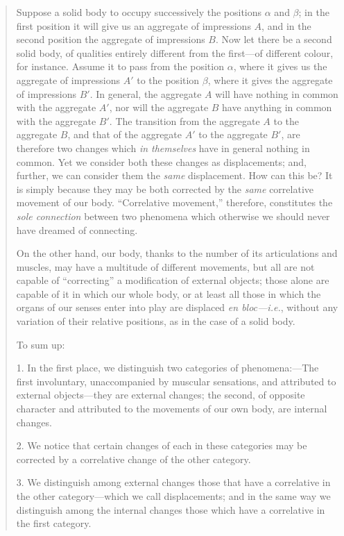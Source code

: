 \documentclass{article}
\begin{document}
\begin{quote}
    Suppose a solid body to occupy successively the positions $\alpha$ and $\beta$; in the first position it will give us an aggregate of impressions $A$, and in the second position the aggregate of impressions $B$.  Now let there be a second solid body, of qualities entirely different from the first---of different colour, for instance.  Assume it to pass from the position $\alpha$, where it gives us the aggregate of impressions $A'$ to the position $\beta$, where it gives the aggregate of impressions $B'$.  In general, the aggregate $A$ will have nothing in common with the aggregate $A'$, nor will the aggregate $B$ have anything in common with the aggregate $B'$.  The transition from the aggregate $A$ to the aggregate $B$, and that of the aggregate $A'$ to the aggregate $B'$, are therefore two changes which \emph{in themselves} have in general nothing in common.  Yet we consider both these changes as displacements; and, further, we can consider them the \emph{same} displacement.  How can this be?  It is simply because they may be both corrected by the \emph{same} correlative movement of our body.  ``Correlative movement,'' therefore, constitutes the \emph{sole connection} between two phenomena which otherwise we should never have dreamed of connecting.  
    
    On the other hand, our body, thanks to the number of its articulations and muscles, may have a multitude of different movements, but all are not capable of ``correcting'' a modification of external objects; those alone are capable of it in which our whole body, or at least all those in which the organs of our senses enter into play are displaced \emph{en bloc---i.e.}, without any variation of their relative positions, as in the case of a solid body.  
    
    To sum up: 
    
    1.  In the first place, we distinguish two categories of phenomena:---The first involuntary, unaccompanied by muscular sensations, and attributed to external objects---they are external changes; the second, of opposite character and attributed to the movements of our own body, are internal changes.
    
    2.  We notice that certain changes of each in these categories may be corrected by a correlative change of the other category.
    
    3.  We distinguish among external changes those that have a correlative in the other category---which we call displacements; and in the same way we distinguish among the internal changes those which have a correlative in the first category.
    

\end{quote}
\end{document}
